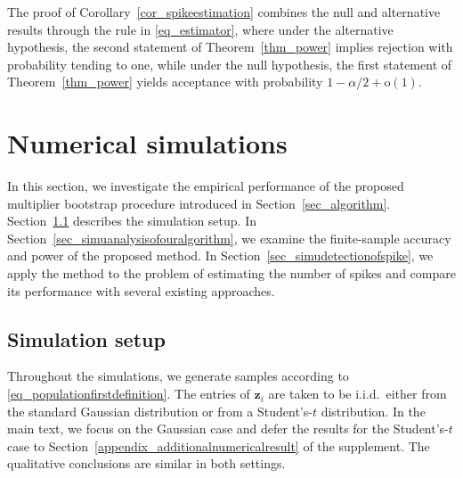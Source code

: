 \documentclass[12pt]{article}
\def\zb{\mathbf z}
\theoremstyle{plain}
\numberwithin{equation}{section}
\begin{document}
The proof of Corollary~\ref{cor_spikeestimation} combines the null and alternative results through the rule in \eqref{eq_estimator}, where under the alternative hypothesis, the second statement of Theorem~\ref{thm_power} implies rejection with probability tending to one, while under the null hypothesis, the first statement of  Theorem~\ref{thm_power} yields acceptance with probability {$1-\alpha/2+\mathrm{o}(1)$}.

\section{Numerical simulations}\label{sec_numerical}
In this section, we investigate the empirical performance of the proposed multiplier bootstrap procedure introduced in Section~\ref{sec_algorithm}. Section~\ref{sec:simu_setup} describes the simulation setup. In Section~\ref{sec_simuanalysisofouralgorithm}, we examine the finite-sample accuracy and power of the proposed method. In Section~\ref{sec_simudetectionofspike}, we apply the method to the problem of estimating the number of spikes and compare its performance with several existing approaches.




\subsection{Simulation setup}
\label{sec:simu_setup}



Throughout the simulations, we generate samples according to \eqref{eq_populationfirstdefinition}. The entries of $\zb_i$ are taken to be i.i.d.\ either from the standard Gaussian distribution or from a Student's-$t$ distribution. In the main text, we focus on the Gaussian case and defer the results for the Student's-$t$ case to Section~\ref{appendix_additionalnumericalresult} of the supplement. The qualitative conclusions are similar in both settings.
\end{document}
